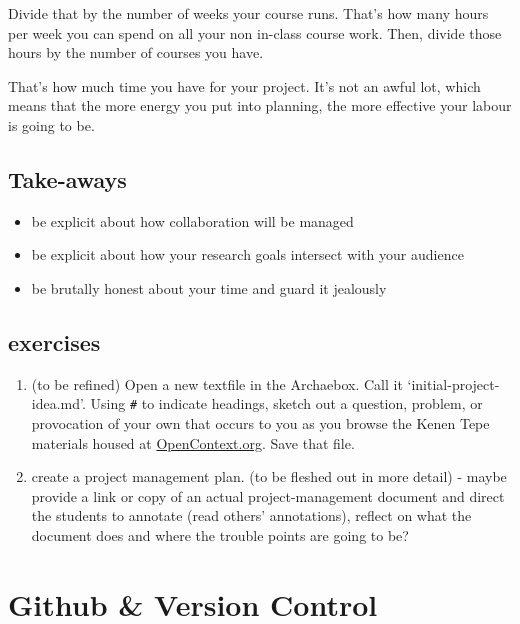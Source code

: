 \documentclass[english,]{book}
\providecommand{\tightlist}{%
  \setlength{\itemsep}{0pt}\setlength{\parskip}{0pt}}
\begin{document}
Divide that by the number of weeks your course runs. That's how many
hours per week you can spend on all your non in-class course work. Then,
divide those hours by the number of courses you have.

That's how much time you have for your project. It's not an awful lot,
which means that the more energy you put into planning, the more
effective your labour is going to be.

\subsection{Take-aways}\label{take-aways}

\begin{itemize}
\tightlist
\item
  be explicit about how collaboration will be managed
\item
  be explicit about how your research goals intersect with your audience
\item
  be brutally honest about your time and guard it jealously
\end{itemize}

\subsection{exercises}\label{exercises-1}

\begin{enumerate}
\def\labelenumi{\arabic{enumi}.}
\tightlist
\item
  (to be refined) Open a new textfile in the Archaebox. Call it
  `initial-project-idea.md'. Using \texttt{\#} to indicate headings,
  sketch out a question, problem, or provocation of your own that occurs
  to you as you browse the Kenen Tepe materials housed at
  \href{https://opencontext.org/projects/3DE4CD9C-259E-4C14-9B03-8B10454BA66E}{OpenContext.org}.
  Save that file.
\item
  create a project management plan. (to be fleshed out in more detail) -
  maybe provide a link or copy of an actual project-management document
  and direct the students to annotate (read others' annotations),
  reflect on what the document does and where the trouble points are
  going to be?
\end{enumerate}

\hypertarget{github-version-control}{\section{Github \& Version
Control}\label{github-version-control}}
\end{document}
